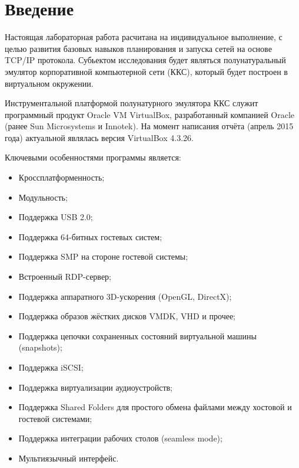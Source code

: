 \newpage
\section*{Введение}

Настоящая лабораторная работа расчитана на индивидуальное выполнение, с целью развития базовых навыков планирования и запуска сетей на основе TCP/IP протокола. Субьектом исследования будет являться полунатуральный эмулятор корпоративной компьютерной сети (ККС), который будет построен в виртуальном окружении.

Инструментальной платформой полунатурного эмулятора ККС служит программный продукт Oracle VM VirtualBox, разработанный компанией Oracle (ранее Sun Microsystems и Innotek). На момент написания отчёта (апрель 2015 года) актуальной являлась версия VirtualBox 4.3.26.

Ключевыми особенностями программы является:
\begin{itemize}
\item Кроссплатформенность;
\item Модульность;
\item Поддержка USB 2.0;
\item Поддержка 64-битных гостевых систем;
\item Поддержка SMP на стороне гостевой системы;
\item Встроенный RDP-сервер;
\item Поддержка аппаратного 3D-ускорения (OpenGL, DirectX);
\item Поддержка образов жёстких дисков VMDK, VHD и прочее;
\item Поддержка цепочки сохраненных состояний виртуальной машины (snapshots);
\item Поддержка iSCSI;
\item Поддержка виртуализации аудиоустройств;
\item Поддержка Shared Folders для простого обмена файлами между хостовой и гостевой системами;
\item Поддержка интеграции рабочих столов (seamless mode);
\item Мультиязычный интерфейс.
\end{itemize}


